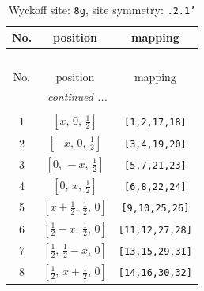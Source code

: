 \documentclass[fleqn,8pt]{jsarticle}
\begin{document}
\renewcommand{\arraystretch}{1.2}
\begin{longtable}{ccc}
\caption{Wyckoff site: {\tt 8g}, site symmetry: {\tt .2.1'}}
 \\
 \hline \hline
No. & position & mapping \\ \hline \endfirsthead

\multicolumn{2}{l}{\tablename\ \thetable{}} \\
 \hline \hline
No. & position & mapping \\ \hline \endhead

 \hline \hline
\multicolumn{2}{r}{\footnotesize\it continued ...} \\ \endfoot

 \hline \hline
\multicolumn{2}{r}{} \\ \endlastfoot

1 & $\left[ x,\, 0,\, \frac{1}{2} \right]$ & {\tt [1,2,17,18]} \\ \hline
2 & $\left[ - x,\, 0,\, \frac{1}{2} \right]$ & {\tt [3,4,19,20]} \\ \hline
3 & $\left[ 0,\, - x,\, \frac{1}{2} \right]$ & {\tt [5,7,21,23]} \\ \hline
4 & $\left[ 0,\, x,\, \frac{1}{2} \right]$ & {\tt [6,8,22,24]} \\ \hline
5 & $\left[ x + \frac{1}{2},\, \frac{1}{2},\, 0 \right]$ & {\tt [9,10,25,26]} \\ \hline
6 & $\left[ \frac{1}{2} - x,\, \frac{1}{2},\, 0 \right]$ & {\tt [11,12,27,28]} \\ \hline
7 & $\left[ \frac{1}{2},\, \frac{1}{2} - x,\, 0 \right]$ & {\tt [13,15,29,31]} \\ \hline
8 & $\left[ \frac{1}{2},\, x + \frac{1}{2},\, 0 \right]$ & {\tt [14,16,30,32]} \\
\end{longtable}
\renewcommand{\arraystretch}{1.2}
\end{document}
